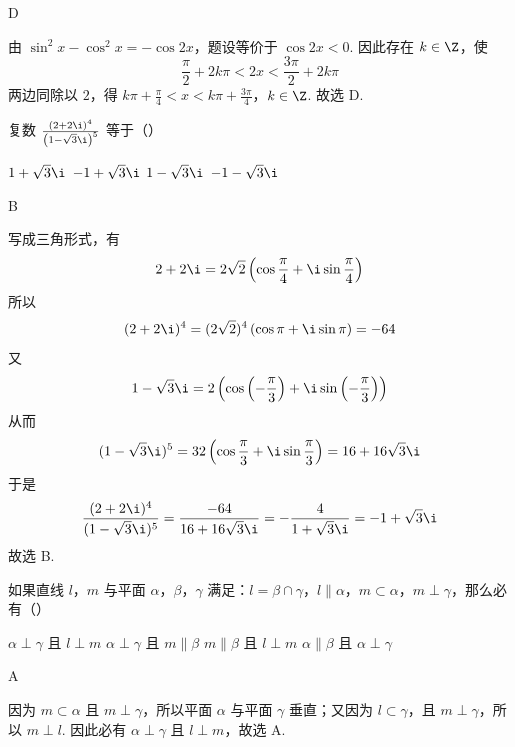\documentclass[UTF8,a4paper,oneside,11pt]{ctexbook}
\begin{document}
\begin{answer}
D
\end{answer}

\begin{solution}
由 \(\sin^2x-\cos^2x=-\cos2x\)，题设等价于 \(\cos2x<0\). 因此存在 \(k\in\Z\)，使
\[
\frac{\pi}{2}+2k\pi<2x<\frac{3\pi}{2}+2k\pi
\]
两边同除以 \(2\)，得
\(k\pi+\frac{\pi}{4}<x<k\pi+\frac{3\pi}{4}\)，\(k\in\Z\).
故选 D.
\end{solution}

\begin{problem}
复数 \(\frac{(2 + 2\i)^4}{\left(1 - \sqrt{3}\i\right)^5}\) 等于（\quad）

\choices
    {\(1 + \sqrt{3}\i\)}
    {\(-1 + \sqrt{3}\i\)}
    {\(1 - \sqrt{3}\i\)}
    {\(-1 - \sqrt{3}\i\)}
\end{problem}

\begin{answer}
B
\end{answer}

\begin{solution}
写成三角形式，有
\[
2+2\i=2\sqrt2\left(\cos\frac{\pi}{4}+\i\sin\frac{\pi}{4}\right)
\]
所以
\[
(2+2\i)^4=(2\sqrt2)^4\left(\cos\pi+\i\sin\pi\right)=-64
\]
又
\[
1-\sqrt3\i=2\left(\cos\left(-\frac{\pi}{3}\right)+\i\sin\left(-\frac{\pi}{3}\right)\right)
\]
从而
\[
(1-\sqrt3\i)^5=32\left(\cos\frac{\pi}{3}+\i\sin\frac{\pi}{3}\right)=16+16\sqrt3\i
\]
于是
\[
\frac{(2+2\i)^4}{(1-\sqrt3\i)^5}=\frac{-64}{16+16\sqrt3\i}=-\frac{4}{1+\sqrt3\i}=-1+\sqrt3\i
\]
故选 B.
\end{solution}

\begin{problem}
如果直线 \(l\)，\(m\) 与平面 \(\alpha\)，\(\beta\)，\(\gamma\) 满足：\(l = \beta \cap \gamma\)，\(l \parallel \alpha\)，\(m \subset \alpha\)，\(m \perp \gamma\)，那么必有（\quad）

\choices
    {\(\alpha \perp \gamma\) 且 \(l \perp m\)}
    {\(\alpha \perp \gamma\) 且 \(m \parallel \beta\)}
    {\(m \parallel \beta\) 且 \(l \perp m\)}
    {\(\alpha \parallel \beta\) 且 \(\alpha \perp \gamma\)}
\end{problem}

\begin{answer}
A
\end{answer}

\begin{solution}
因为 \(m\subset\alpha\) 且 \(m\perp\gamma\)，所以平面 \(\alpha\) 与平面 \(\gamma\) 垂直；又因为 \(l\subset\gamma\)，且 \(m\perp\gamma\)，所以 \(m\perp l\). 因此必有 \(\alpha\perp\gamma\) 且 \(l\perp m\)，故选 A.
\end{solution}
\end{document}
